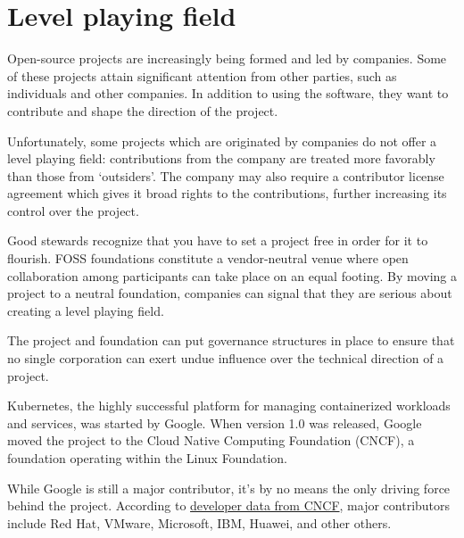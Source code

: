 


\chapter{Level playing field}

Open-source projects are increasingly being formed and led by companies.  Some of these projects attain significant attention from other parties, such as individuals and other companies.  In addition to using the software, they want to contribute and shape the direction of the project.

Unfortunately, some projects which are originated by companies do not offer a level playing field: contributions from the company are treated more favorably than those from `outsiders'.  The company may also require a contributor license agreement which gives it broad rights to the contributions, further increasing its control over the project.

Good stewards recognize that you have to set a project free in order for it to flourish.  FOSS foundations constitute a vendor-neutral venue where open collaboration among participants can take place on an equal footing.  By moving a project to a neutral foundation, companies can signal that they are serious about creating a level playing field.

The project and foundation can put governance structures in place to ensure that no single corporation can exert undue influence over the technical direction of a project.

\begin{kaobox}[frametitle=Kubernetes and the Cloud Native Computing Foundation]

Kubernetes, the highly successful platform for managing containerized workloads and services, was started by Google.  When version 1.0 was released, Google moved the project to the Cloud Native Computing Foundation (CNCF), a foundation operating within the Linux Foundation.

While Google is still a major contributor, it's by no means the only driving force behind the project.  According to \href{https://k8s.devstats.cncf.io/d/9/companies-table}{developer data from CNCF}, major contributors include Red Hat, VMware, Microsoft, IBM, Huawei, and other others.

\end{kaobox}

